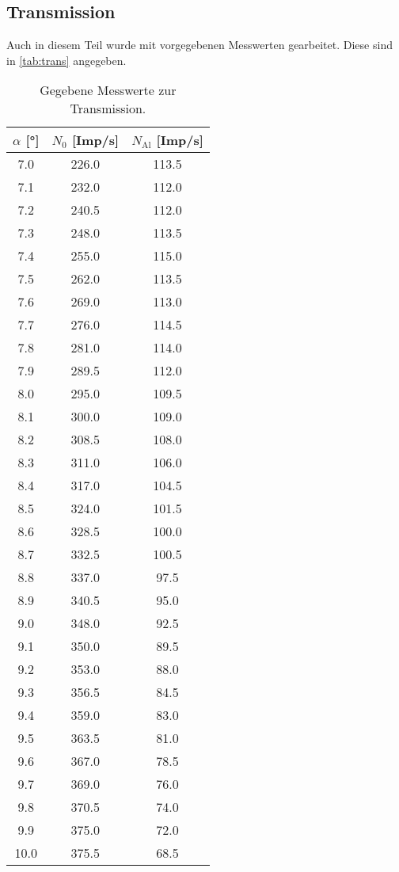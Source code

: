 \subsection{Transmission}
\label{sec:Transmission}
Auch in diesem Teil wurde mit vorgegebenen Messwerten gearbeitet. Diese sind in
\autoref{tab:trans} angegeben.
\begin{table}
    \centering
    \begin{tabular}{c c c}
        \toprule
        $\alpha$ [°] & $N_0$ [Imp/s] & $N_\text{Al}$ [Imp/s] \\
        \midrule
        7.0     &  226.0 & 113.5 \\
        7.1     &  232.0 & 112.0 \\
        7.2     &  240.5 & 112.0 \\
        7.3     &  248.0 & 113.5 \\
        7.4     &  255.0 & 115.0 \\
        7.5     &  262.0 & 113.5 \\
        7.6     &  269.0 & 113.0 \\
        7.7     &  276.0 & 114.5 \\
        7.8     &  281.0 & 114.0 \\
        7.9     &  289.5 & 112.0 \\
        8.0     &  295.0 & 109.5 \\
        8.1     &  300.0 & 109.0 \\
        8.2     &  308.5 & 108.0 \\
        8.3     &  311.0 & 106.0 \\
        8.4     &  317.0 & 104.5 \\
        8.5     &  324.0 & 101.5 \\
        8.6     &  328.5 & 100.0 \\
        8.7     &  332.5 & 100.5  \\
        8.8     &  337.0 & 97.5  \\
        8.9     &  340.5 & 95.0  \\
        9.0     &  348.0 & 92.5  \\
        9.1     &  350.0 & 89.5  \\
        9.2     &  353.0 & 88.0  \\
        9.3     &  356.5 & 84.5 \\
        9.4     &  359.0 & 83.0 \\
        9.5     &  363.5 & 81.0 \\
        9.6     &  367.0 & 78.5 \\
        9.7     &  369.0 & 76.0 \\
        9.8     &  370.5 & 74.0 \\
        9.9     &  375.0 & 72.0 \\
        10.0&  375.5 & 68.5 \\
        \bottomrule
    \end{tabular}
    \caption{Gegebene Messwerte zur Transmission.}
    \label{tab:trans}
\end{table}
